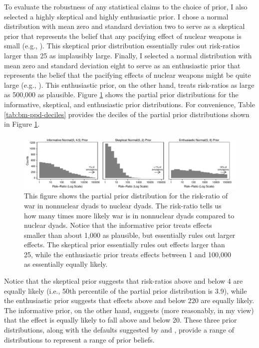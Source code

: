 \documentclass[12pt]{article}
\begin{document}
To evaluate the robustness of any statistical claims to the choice of prior, I also selected a highly skeptical and highly enthusiastic prior. 
I chose a normal distribution with mean zero and standard deviation two to serve as a skeptical prior that represents the belief that any pacifying effect of nuclear weapons is small (e.g., \citealt{Mueller1988}). 
This skeptical prior distribution essentially rules out risk-ratios larger than 25 as implausibly large. 
Finally, I selected a normal distribution with mean zero and standard deviation eight to serve as an enthusiastic prior that represents the belief that the pacifying effects of nuclear weapons might be quite large (e.g., \citealt{Mearsheimer1993}). 
This enthusiastic prior, on the other hand, treats risk-ratios as large as 500,000 as plausible. 
Figure \ref{fig:bm-ppd-hist} shows the partial prior distributions for the informative, skeptical, and enthusiastic prior distributions. 
For convenience, Table \ref{tab:bm-ppd-deciles} provides the deciles of the partial prior distributions shown in Figure \ref{fig:bm-ppd-hist}. 

\begin{figure}[H]
\begin{center}
\includegraphics[scale = .8]{figs/bm-ppd-hist.pdf}
\caption{This figure shows the partial prior distribution for the risk-ratio of war in nonnuclear dyads to nuclear dyads. 
The risk-ratio tells us how many times more likely war is in nonnuclear dyads compared to nuclear dyads. 
Notice that the informative prior treats effects smaller than about 1,000 as plausible, but essentially rules out larger effects. 
The skeptical prior essentially rules out effects larger than 25, while the enthusiastic prior treats effects between 1 and 100,000 as essentially equally likely.}\label{fig:bm-ppd-hist}
\end{center}
\end{figure}



Notice that the skeptical prior suggests that risk-ratios above and below 4 are equally likely (i.e., 50th percentile of the partial prior distribution is 3.9), while the enthusiastic prior suggests that effects above and below 220 are equally likely. 
The informative prior, on the other hand, suggests (more reasonably, in my view) that the effect is equally likely to fall above and below 20. 
These three prior distributions, along with the defaults suggested by \cite{Zorn2005} and \cite{Gelmanetal2008}, provide a range of distributions to represent a range of prior beliefs.
\end{document}
